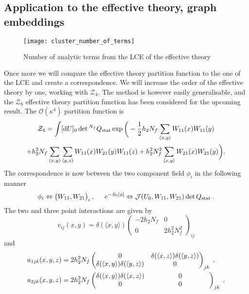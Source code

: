 \subsection{Application to the effective theory, graph embeddings}

\begin{figure}[t]
  {\centering
    \texttt{[image: cluster\_number\_of\_terms]}\par}
  \caption{Number of analytic terms from the LCE of the effective theory}
  \label{fig:cluster_num_terms}
\end{figure}

Once more we will compare the effective theory partition function to the one of
the LCE and create a correspondence. We will increase the order of the effective
theory by one, working with $\mathcal{Z}_4$. The method is however easily
generalisable, and the $\mathcal{Z}_8$ effective theory partition function has
been considered for the upcoming result. The $\mathcal{O}(\kappa^4)$ partition
function is
%
\begin{multline}
  \mathcal{Z}_4 = \int [ \mathrm{d} U ]_0 \det{}^{N_f} Q_{\text{stat}} \exp \bigg(-\frac{1}{2}
    h_2 N_f \sum_{\langle x,y \rangle} W_{11} (x) W_{11} (y)\\
  + h_2^2 N_f \sum_{\langle x,y \rangle} \sum_{\langle y,z \rangle} W_{11}(x)
    W_{21}(y) W_{11}(z)
  + h_2^2 N_f^2 \sum_{\langle x,y \rangle} W_{21}(x) W_{21}(y) \bigg).
\end{multline}
%
The correspondence is now between the two component field $\phi_i$ in the
following manner
%
\begin{equation}
  \phi_i \Leftrightarrow \big(W_{11}, W_{21}\big)_i\:, \hskip .5cm
  e^{-S_0[\phi]} \Leftrightarrow \mathcal{J} (U_0, W_{11}, W_{21}) \det Q_{\text{stat}}
  \:.
\end{equation}
%
The two and three point interactions are given by
%
\begin{equation}
  v_{ij}(x,y) = \delta(\langle x,y \rangle)
    \begin{pmatrix}
      -2 h_2 N_f & 0 \\
      0 & 2 h_2^2 N_f^2
    \end{pmatrix}_{ij}
\end{equation}
%
and
%
\begin{align}
  u_{1jk}(x,y,z) &= 2 h_2^2 N_f 
    \begin{pmatrix}
      0 & \delta(\langle x,z \rangle) \delta(\langle y,z \rangle) \\
      \delta(\langle x,y \rangle) \delta(\langle y,z \rangle) & 0
    \end{pmatrix}_{jk} \;,\\
  u_{2jk}(x,y,z) &= 2 h_2^2 N_f  
  \begin{pmatrix}
    \delta(\langle x,y \rangle) \delta(\langle x,z \rangle) & 0 \\
    0 & \makebox[3cm][c]{$0$}
  \end{pmatrix}_{jk}\;.
\end{align}
